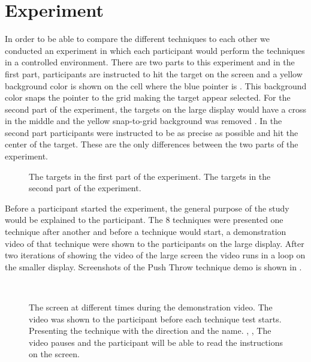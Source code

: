 \section{Experiment} \label{sec:experiment}
In order to be able to compare the different techniques to each other we conducted an experiment in which each participant would perform the techniques in a controlled environment.
There are two parts to this experiment and in the first part, participants are instructed to hit the target on the screen and a yellow background color is shown on the cell where the blue pointer is .
This background color snaps the pointer to the grid making the target appear selected.
For the second part of the experiment, the targets on the large display would have a cross in the middle and the yellow snap-to-grid background was removed .
In the second part participants were instructed to be as precise as possible and hit the center of the target.
These are the only differences between the two parts of the experiment.

\begin{figure}[H]
\centering
{}
\hspace{0.05\columnwidth}
\caption{\protect{} The targets in the first part of the experiment. \protect{} The targets in the second part of the experiment.}
\end{figure}

Before a participant started the experiment, the general purpose of the study would be explained to the participant.
The 8 techniques were presented one technique after another and before a technique would start, a demonstration video of that technique were shown to the participants on the large display.
After two iterations of showing the video of the large screen the video runs in a loop on the smaller display.
Screenshots of the Push Throw technique demo is shown in .

\begin{figure}[H]
\\
\caption{The screen at different times during the demonstration video. The video was shown to the participant before each technique test starts. \protect{} Presenting the technique with the direction and the name. \protect{}, \protect{}, \protect{} The video pauses and the participant will be able to read the instructions on the screen.}
\label{fig:demovideo}
\end{figure}

